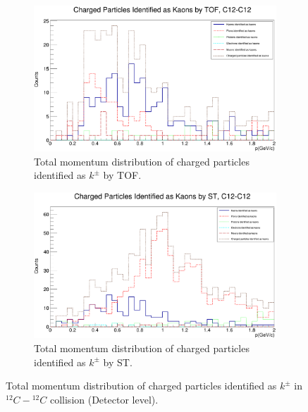 \documentclass[12pt, twocolumn]{article}
\begin{document}
\begin{figure}[h]
\centering
\begin{subfigure}[h]{0.49\textwidth}
\centering
\includegraphics[scale=0.14]{Detector_pToT_kaons(tof)_C12.png}
\caption{Total momentum distribution of charged particles identified as $k^{\pm}$ by TOF.}
\label{Detector - Total momentum distribution of kaons (TOF) C12.}
\end{subfigure}
\hfill
\begin{subfigure}[h]{0.49\textwidth}
\centering
\includegraphics[scale=0.14]{Detector_pToT_kaons(st)_C12.png}
\caption{Total momentum distribution of charged particles identified as $k^{\pm}$ by ST.}
\label{Detector - Total momentum distribution of kaons (ST) C12.}
\end{subfigure}
\caption{Total momentum distribution of charged particles identified as $k^{\pm}$ in $^{12}C-{^{12}C}$ collision (Detector level).}
\label{Total momentum distribution of charged particles identified as kaons in C12-C12 collision.}
\end{figure}
\end{document}
